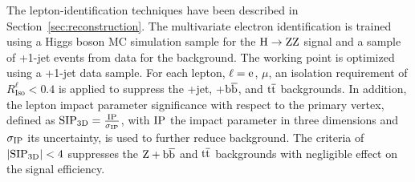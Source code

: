\documentclass[12pt,twoside,a4paper,cmspaper,final,collab]{cms-tdr}
\begin{document}
The lepton-identification techniques have been described in Section~\ref{sec:reconstruction}.
The multivariate electron identification is trained using a Higgs boson MC simulation sample for the
$\mathrm{H}\rightarrow\mathrm{Z}\mathrm{Z}$ signal and a sample of \PW+1-jet events from data for the background.
The working point is  optimized using a \cPZ+1-jet data sample.
For each lepton, $\ell = \mathrm{e}$, $\mu$, an isolation requirement of
$ R_\text{Iso}^{\ell} < 0.4$ is applied to suppress
the \cPZ+jet, \cPZ+$\mathrm{b}\overline{\mathrm{b}}$, and $\mathrm{t}\overline{\mathrm{t}}$ backgrounds.
In addition, the lepton impact parameter significance with respect
to the primary vertex, defined as
${\rm SIP_{3D}}= \frac{\rm IP}{\sigma_{\rm IP}} $,
with ${\rm IP}$ the impact parameter in three dimensions
and  $\sigma_{\rm IP}$ its uncertainty, is used to further reduce background.
The criteria of $| {\rm SIP_{3D}}  | < 4$ suppresses
the $\mathrm{Z} + \mathrm{b}\overline{\mathrm{b}}$ and $\mathrm{t}\overline{\mathrm{t}}$ backgrounds with negligible effect on the
signal efficiency.
\end{document}

